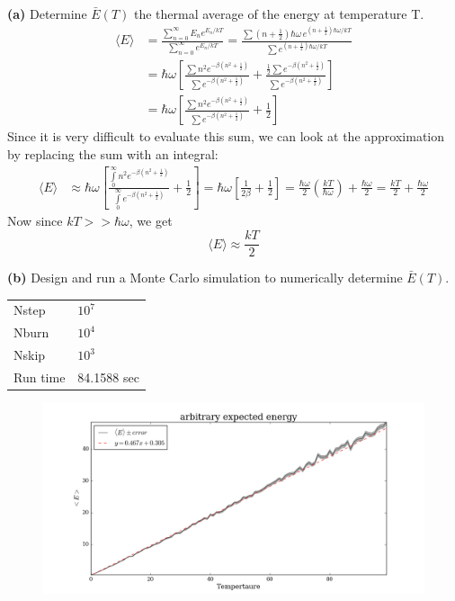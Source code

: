 \documentclass{article}
\begin{document}
\textbf{(a)} Determine $\bar{E}(T)$ the thermal average of the energy at temperature T. 
\begin{align*}
	\langle E \rangle 
	&= \frac{\sum\limits_{n=0}^{\infty} E_n e^{E_n/kT}}{\sum\limits_{n=0}^{\infty} e^{E_n/kT}}
	= \frac{\sum (n+\frac{1}{2})\hbar\omega \, e^{(n+\frac{1}{2})\hbar\omega/kT}}{\sum e^{(n+\frac{1}{2})\hbar\omega/kT}} \\
	&= \hbar\omega \left[\frac{\sum n^2 e^{-\beta (n^2+\frac{1}{2})}}{\sum e^{-\beta (n^2+\frac{1}{2})}} + \frac{ \frac{1}{2} \sum e^{-\beta (n^2+\frac{1}{2})} }{\sum e^{-\beta (n^2+\frac{1}{2})}} \right] \\
	&= \hbar\omega \left[\frac{\sum n^2 e^{-\beta (n^2+\frac{1}{2})}}{\sum e^{-\beta (n^2+\frac{1}{2})}} + \frac{1}{2} \right]
\end{align*}
Since it is very difficult to evaluate this sum, we can look at the approximation by replacing the sum with an integral:
\begin{align*}
	\langle E \rangle 
	&\approx \hbar\omega \left[\frac{\int\limits_{0}^{\infty} n^2 e^{-\beta (n^2+\frac{1}{2})}}{\int\limits_{0}^{\infty} e^{-\beta (n^2+\frac{1}{2})}} + \frac{1}{2} \right] 
	= \hbar\omega \left[\frac{1}{2\beta} + \frac{1}{2} \right]
	= \frac{\hbar\omega}{2} \left(\frac{kT}{\hbar\omega} \right) + \frac{\hbar\omega}{2}
	= \frac{kT}{2} + \frac{\hbar\omega}{2}
\end{align*}
Now since $kT >> \hbar\omega$, we get
\[\langle E \rangle \approx \frac{kT}{2} \]

\textbf{(b)} Design and run a Monte Carlo simulation to numerically determine $\bar{E}(T)$. \\

\begin{table}[H]
\centering
\begin{tabular}{|l|l|}
	\hline
	Nstep    & $10^7$ \\
	Nburn    & $10^4$ \\
	Nskip    & $10^3$ \\
	Run time & 84.1588 sec \\
	\hline
\end{tabular}
\end{table}

\begin{figure}[H]
\begin{center}
\includegraphics[width=16cm]{../output/arbitrary/expected.png} 
\end{center}
\end{figure}
\end{document}
